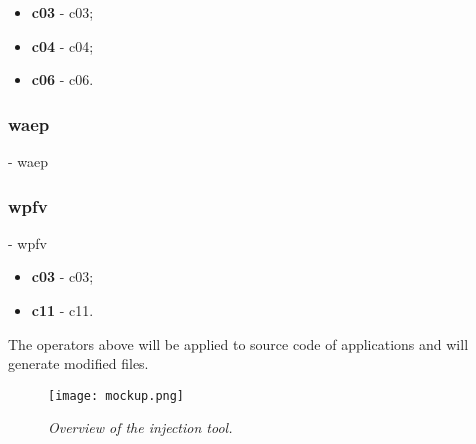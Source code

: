 	\begin{itemize}
		\item \textbf{\acs{c03}} - \Acl{c03};
		\item \textbf{\acs{c04}} - \Acl{c04};
		\item \textbf{\acs{c06}} - \Acl{c06}.
	\end{itemize}

	\hypertarget{waep}{}
	\subsubsection{\textbf{\acs{waep}}} - \Acl{waep}




	\hypertarget{wpfv}{}
	\subsubsection{\textbf{\acs{wpfv}}} - \Acl{wpfv}

	\begin{itemize}
		\item \textbf{\acs{c03}} - \Acl{c03};
		\item \textbf{\acs{c11}} - \Acl{c11}.
	\end{itemize}

The operators above will be applied to source code of applications and will generate modified files.

\begin{figure}[!ht]
\begin{center}
\texttt{[image: mockup.png]}
\caption{\small \sl Overview of the injection tool.\label{fig:mockup}}
\end{center}
\end{figure}

\clearpage
